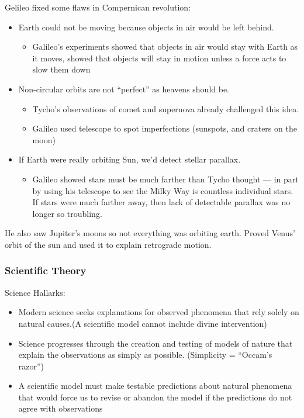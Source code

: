 Gelileo fixed some flaws in Compernican revolution:
\begin{itemize}
\item Earth could not be moving because objects in air would be left behind.
\begin{itemize}
\item Galileo's experiments showed that objects in air would stay with Earth as it moves, showed that objects will stay in motion unless a force acts to slow them down
\end{itemize}
\item Non-circular orbits are not ``perfect'' as heavens should be.
\begin{itemize}
\item Tycho's observations of comet and supernova already challenged this idea.
\item Galileo used telescope to spot imperfections (sunspots, and craters on the moon)
\end{itemize}
\item If Earth were really orbiting Sun, we'd detect stellar parallax.
\begin{itemize}
\item Galileo showed stars must be much farther than Tycho thought — in part by using his telescope to see the Milky Way is countless individual stars. If stars were much farther away, then lack of detectable parallax was no longer so troubling.
\end{itemize}
\end{itemize}
He also saw Jupiter's moons so not everything was orbiting earth. Proved Venus' orbit of the sun and used it to explain retrograde motion.

\subsubsection{Scientific Theory}
Science Hallarks:
\begin{itemize}
\item Modern science seeks explanations for observed phenomena that rely solely on natural causes.(A scientific model cannot include divine intervention)
\item Science progresses through the creation and  testing of models of nature that explain the  observations as simply as possible. (Simplicity = ``Occam's razor'')
\item A scientific model must make testable predictions about natural phenomena that would force us to revise or abandon the model if the predictions do not agree with observations
\end{itemize}

